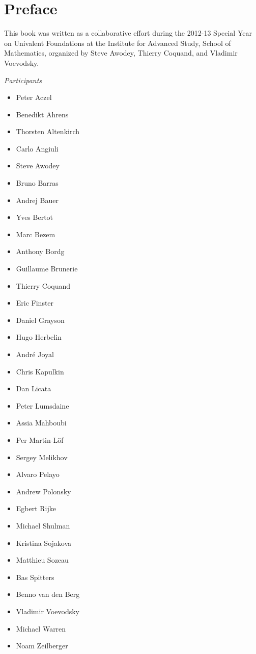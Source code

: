 \chapter*{Preface}
\label{cha:preface}


This book was written as a collaborative effort during the 2012-13 Special Year on Univalent Foundations at the Institute for Advanced Study, School of Mathematics, organized by Steve Awodey, Thierry Coquand, and Vladimir Voevodsky.

\bigskip
\centerline{\emph{Participants}}
%
\begin{multicols}{3}{
\begin{itemize}
\item[] Peter Aczel
\item[] Benedikt Ahrens
\item[] Thorsten Altenkirch
\item[] Carlo Angiuli
\item[] Steve Awodey
\item[] Bruno Barras
\item[] Andrej Bauer
\item[] Yves Bertot
\item[] Marc Bezem
\item[] Anthony Bordg
\item[] Guillaume Brunerie
\item[] Thierry Coquand
\item[] Eric Finster
\item[] Daniel Grayson
\item[] Hugo Herbelin
\item[] Andr\'e Joyal
\item[] Chris Kapulkin
\item[] Dan Licata
\item[] Peter Lumsdaine
\item[] Assia Mahboubi
\item[] Per Martin-L\"of
\item[] Sergey Melikhov
\item[] Alvaro Pelayo
\item[] Andrew Polonsky
\item[] Egbert Rijke
\item[] Michael Shulman
\item[] Kristina Sojakova
\item[] Matthieu Sozeau
\item[] Bas Spitters
\item[] Benno van den Berg
\item[] Vladimir Voevodsky
\item[] Michael Warren
\item[] Noam Zeilberger
\end{itemize}
}
\end{multicols}

